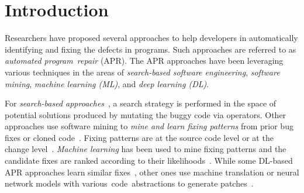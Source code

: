 \section{Introduction}


Researchers have proposed several approaches to help developers in
automatically identifying and fixing the defects in programs. Such
approaches are referred to as {\em automated program~repair}
(APR). The APR approaches have been leveraging various techniques in
the areas of {\em search-based software engineering}, {\em software
  mining}, {\em machine learning (ML)}, and {\em deep learning (DL)}.

For {\em search-based
  approaches}~\cite{LeGoues-icse12,le2011genprog,martinez2016astor,qi2014strength},
a search strategy is performed in the space of potential solutions
produced by mutating the buggy code via operators. Other approaches
use software mining to {\em mine and learn fixing patterns} from prior
bug fixes
\cite{kim2013automatic,le2016history,liu2019avatar,tbar-issta19,nguyen2013semfix}
or cloned code~\cite{icse10,ray-fse12}. Fixing patterns are at the
source code level \cite{liu2019avatar,tbar-issta19} or at the change
level~\cite{wen2018context,Simfix,koyuncu2018fixminer}.  {\em Machine
  learning} has been used to mine fixing patterns and the candidate
fixes are ranked according to their
likelihoods~\cite{long2016automatic,long2017automatic,saha2017elixir}.
While some DL-based APR approaches learn similar
fixes~\cite{gupta2017deepfix,white2019sorting,white2016deep}, other
ones use machine translation or neural network models with
various~code~abstractions to generate
patches~\cite{chakrabortycodit,chen2018sequencer,hata2018learning,tufano2018empirical,see2017get,tufano2019learning,icse20}.

%
  

